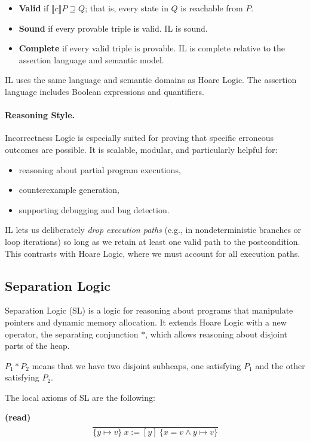 \documentclass[parskip=half]{scrartcl}
\begin{document}
\begin{itemize}
  \item \textbf{Valid} if $\llbracket c \rrbracket P \supseteq Q$; that is, every state in $Q$ is reachable from $P$.
  \item \textbf{Sound} if every provable triple is valid. IL is sound.
  \item \textbf{Complete} if every valid triple is provable. IL is complete relative to the assertion language and semantic model.
\end{itemize}
IL uses the same language and semantic domains as Hoare Logic. The assertion language includes Boolean expressions and quantifiers. 
\paragraph{Reasoning Style.}
Incorrectness Logic is especially suited for proving that specific erroneous outcomes are possible. It is scalable, modular, and particularly helpful for:
\begin{itemize}
  \item reasoning about partial program executions,
  \item counterexample generation,
  \item supporting debugging and bug detection.
\end{itemize}

IL lets us deliberately \emph{drop execution paths} (e.g., in nondeterministic branches or loop iterations) so long as we retain at least one valid path to the postcondition. This contrasts with Hoare Logic, where we must account for all execution paths.

\subsection{Separation Logic} \label{SL}

Separation Logic (SL) is a logic for reasoning about programs that manipulate pointers and dynamic memory allocation. 
It extends Hoare Logic with a new operator, the separating conjunction \(\ast\), which allows reasoning about disjoint parts of the heap.

\ie \(P_1 \ast P_2\)
means that we have two disjoint subheaps, one satisfying \(P_1\) and the other satisfying \(P_2\).

The local axioms of SL are the following:

\textbf{(read)} 
\[
\frac{}{\{y\mapsto v\}\ x:=[y]\ \{x=v\wedge y\mapsto v\}}
\]
\end{document}
